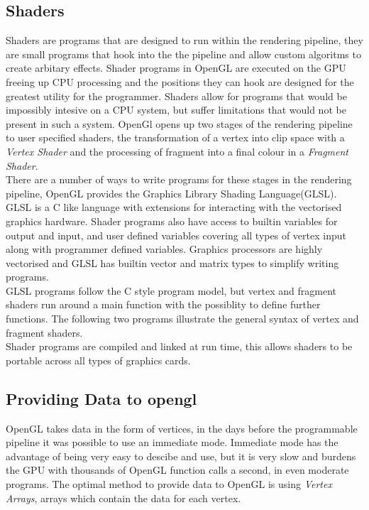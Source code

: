 \subsection{Shaders}
Shaders are programs that are designed to run within the rendering pipeline, they
are small programs that hook into the the pipeline and allow custom algoritms to
create arbitary effects. Shader programs in OpenGL are executed on the GPU 
freeing up CPU processing and the positions they can hook are designed for the
greatest utility for the programmer. Shaders allow for programs that would be 
impossibly intesive on a CPU system, but suffer limitations that would not be 
present in such a system.
OpenGl opens up two stages of the rendering
pipeline to user specified shaders, the transformation of a vertex into clip 
space with a \emph{Vertex Shader} and the processing of fragment into a final
colour in a \emph{Fragment Shader}.\\

There are a number of ways to write programs for these stages in the rendering
pipeline, OpenGL provides the Graphics Library Shading Language(GLSL). GLSL is 
a C like language with extensions for interacting with the vectorised graphics
hardware. Shader programs also have access to builtin variables for output and
input, and user defined variables covering all types of vertex input along with
programmer defined variables. Graphics processors are highly vectorised and GLSL
has builtin vector and matrix types to simplify writing programs.\\

GLSL programs follow the C style program model, but vertex and fragment shaders 
run around a main function with the possiblity to define further functions. The 
following two programs illustrate the general syntax of vertex and fragment 
shaders.\\





Shader programs are compiled and linked at run time, this allows shaders to be 
portable across all types of graphics cards.\\

\subsection{Providing Data to opengl}
OpenGL takes data in the form of vertices, in the days before the programmable 
pipeline it was possible to use an immediate mode. Immediate mode has the 
advantage of being very easy to descibe and use, but it is very slow and burdens
the GPU with thousands of OpenGL function calls a second, in even moderate 
programs. The optimal method to provide data to OpenGL is using \emph{Vertex
Arrays}, arrays which contain the data for each vertex.\\

